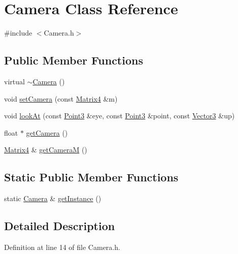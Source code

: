 \hypertarget{classCamera}{\section{Camera Class Reference}
\label{classCamera}
}


{\ttfamily \#include $<$Camera.\-h$>$}

\subsection*{Public Member Functions}
\begin{DoxyCompactItemize}
\item 
virtual \hyperlink{classCamera_ad1897942d0ccf91052386388a497349f}{$\sim$\-Camera} ()
\item 
void \hyperlink{classCamera_a16c5e6f7b2eed95a78675f55c4a435e6}{set\-Camera} (const \hyperlink{classVectormath_1_1Aos_1_1Matrix4}{Matrix4} \&m)
\item 
void \hyperlink{classCamera_aa91c4a447f23e08322ef17f2786851bf}{look\-At} (const \hyperlink{classVectormath_1_1Aos_1_1Point3}{Point3} \&eye, const \hyperlink{classVectormath_1_1Aos_1_1Point3}{Point3} \&point, const \hyperlink{classVectormath_1_1Aos_1_1Vector3}{Vector3} \&up)
\item 
float $\ast$ \hyperlink{classCamera_a25f2f9d8ccc76f38c0580709587afadf}{get\-Camera} ()
\item 
\hyperlink{classVectormath_1_1Aos_1_1Matrix4}{Matrix4} \& \hyperlink{classCamera_a156b6aba4309cde6f0252ff325663e2f}{get\-Camera\-M} ()
\end{DoxyCompactItemize}
\subsection*{Static Public Member Functions}
\begin{DoxyCompactItemize}
\item 
static \hyperlink{classCamera}{Camera} \& \hyperlink{classCamera_aa84baebe5d771ddfd82a5b55bd3fde39}{get\-Instance} ()
\end{DoxyCompactItemize}


\subsection{Detailed Description}


Definition at line 14 of file Camera.\-h.



